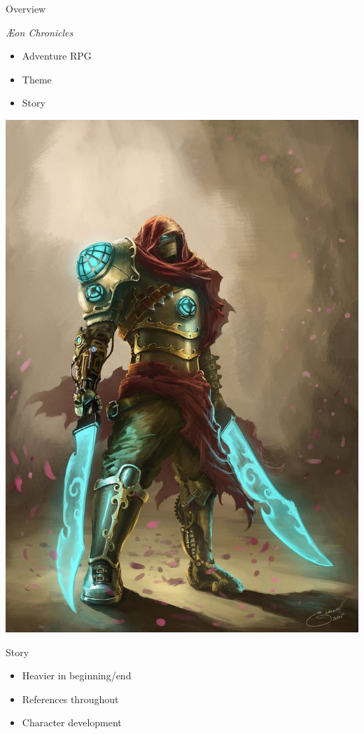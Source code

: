 \documentclass{../teamepsilon}
\title{\aeon}
\author{\te}
\institute{Colorado School of Mines}
\newcommand\aeon{\textit{\AE on Chronicles}\xspace}
\begin{document}
\begin{frame}{Overview}
    \begin{minipage}{0.55\textwidth}
        \aeon
        \begin{itemize}
            \item Adventure RPG
            \item Theme
            \item Story
        \end{itemize}
    \end{minipage}%
    \begin{minipage}{0.45\textwidth}
        \includegraphics[scale=0.15]{../graphics/warrior}
    \end{minipage}
\end{frame}

\begin{frame}{Story}
    \begin{itemize}
        \item Heavier in beginning/end
        \item References throughout
        \item Character development
    \end{itemize}
\end{frame}
\end{document}

